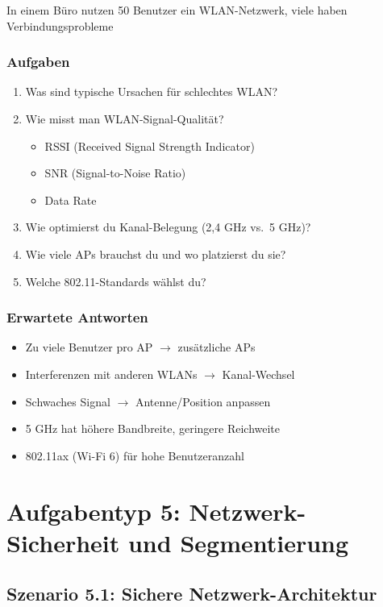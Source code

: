 \documentclass[12pt,a4paper,german]{report}
\begin{document}
In einem Büro nutzen 50 Benutzer ein WLAN-Netzwerk, viele haben Verbindungsprobleme

\subsection{Aufgaben}
\begin{enumerate}
    \item Was sind typische Ursachen für schlechtes WLAN?
    \item Wie misst man WLAN-Signal-Qualität?
    \begin{itemize}
        \item RSSI (Received Signal Strength Indicator)
        \item SNR (Signal-to-Noise Ratio)
        \item Data Rate
    \end{itemize}
    \item Wie optimierst du Kanal-Belegung (2,4 GHz vs.\ 5 GHz)?
    \item Wie viele APs brauchst du und wo platzierst du sie?
    \item Welche 802.11-Standards wählst du?
\end{enumerate}

\subsection{Erwartete Antworten}
\begin{itemize}
    \item Zu viele Benutzer pro AP $\rightarrow$ zusätzliche APs
    \item Interferenzen mit anderen WLANs $\rightarrow$ Kanal-Wechsel
    \item Schwaches Signal $\rightarrow$ Antenne/Position anpassen
    \item 5 GHz hat höhere Bandbreite, geringere Reichweite
    \item 802.11ax (Wi-Fi 6) für hohe Benutzeranzahl
\end{itemize}

\chapter{Aufgabentyp 5: Netzwerk-Sicherheit und Segmentierung}

\section{Szenario 5.1: Sichere Netzwerk-Architektur}
\end{document}
